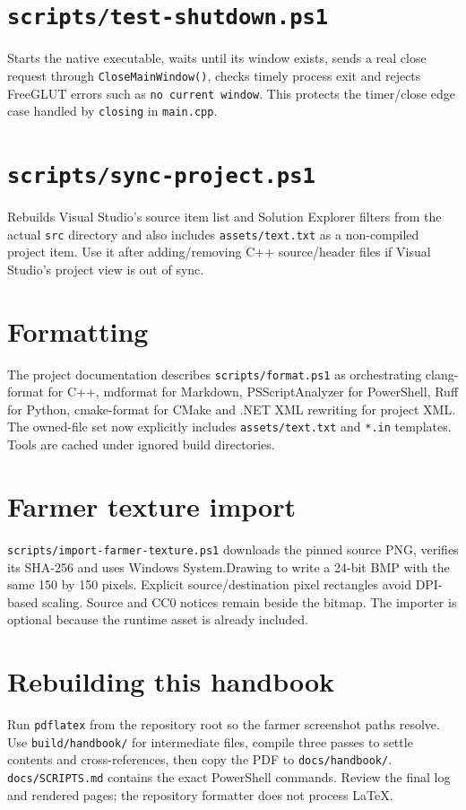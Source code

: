 \documentclass[11pt,a4paper,openany]{book}
\newcommand{\code}[1]{\texttt{#1}}
\newcommand{\file}[1]{\nolinkurl{#1}}
\begin{document}
\section{\texttt{scripts/test-shutdown.ps1}}
Starts the native executable, waits until its window exists, sends a real close request through \code{CloseMainWindow()}, checks timely process exit and rejects FreeGLUT errors such as \code{no current window}. This protects the timer/close edge case handled by \code{closing} in \file{main.cpp}.

\section{\texttt{scripts/sync-project.ps1}}
Rebuilds Visual Studio's source item list and Solution Explorer filters from the actual \file{src} directory and also includes \file{assets/text.txt} as a non-compiled project item. Use it after adding/removing C++ source/header files if Visual Studio's project view is out of sync.

\section{Formatting}
The project documentation describes \file{scripts/format.ps1} as orchestrating clang-format for C++, mdformat for Markdown, PSScriptAnalyzer for PowerShell, Ruff for Python, cmake-format for CMake and .NET XML rewriting for project XML. The owned-file set now explicitly includes \file{assets/text.txt} and \file{*.in} templates. Tools are cached under ignored build directories.

\section{Farmer texture import}
\file{scripts/import-farmer-texture.ps1} downloads the pinned source PNG, verifies its SHA-256 and uses Windows System.Drawing to write a 24-bit BMP with the same 150 by 150 pixels. Explicit source/destination pixel rectangles avoid DPI-based scaling. Source and CC0 notices remain beside the bitmap. The importer is optional because the runtime asset is already included.

\section{Rebuilding this handbook}
Run \code{pdflatex} from the repository root so the farmer screenshot paths resolve. Use \file{build/handbook/} for intermediate files, compile three passes to settle contents and cross-references, then copy the PDF to \file{docs/handbook/}. \file{docs/SCRIPTS.md} contains the exact PowerShell commands. Review the final log and rendered pages; the repository formatter does not process LaTeX.
\end{document}
